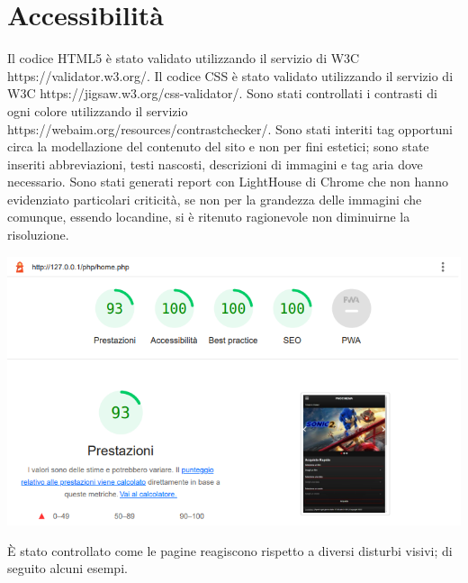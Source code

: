 \documentclass[a4paper, 12pt]{article}
\begin{document}
\section{Accessibilità}
Il codice HTML5 è stato validato utilizzando il servizio di W3C https://validator.w3.org/.
Il codice CSS è stato validato utilizzando il servizio di W3C https://jigsaw.w3.org/css-validator/.
Sono stati controllati i contrasti di ogni colore utilizzando il servizio \\https://webaim.org/resources/contrastchecker/.
Sono stati interiti tag opportuni circa la modellazione del contenuto del sito e non per fini estetici; sono state inseriti abbreviazioni, testi nascosti, descrizioni di immagini e tag aria dove necessario.
Sono stati generati report con LightHouse di Chrome che non hanno evidenziato particolari criticità, se non per la grandezza delle immagini che comunque, essendo locandine, si è ritenuto ragionevole non
diminuirne la risoluzione.
\begin{center}
    \includegraphics[scale=0.4]{home}
\end{center}
È stato controllato come le pagine reagiscono rispetto a diversi disturbi visivi; di seguito alcuni esempi.
\end{document}

